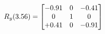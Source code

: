\documentclass[preview]{standalone}
\begin{document}
\begin{align*}
\special{dvisvgm:raw <g id='unique000'>}R_{y}(3.56) = \begin{bmatrix}-0.91 & 0 & -0.41 \\0 & 1 & 0 \\+0.41 & 0 & -0.91\end{bmatrix}\special{dvisvgm:raw </g>}
\end{align*}
\end{document}
